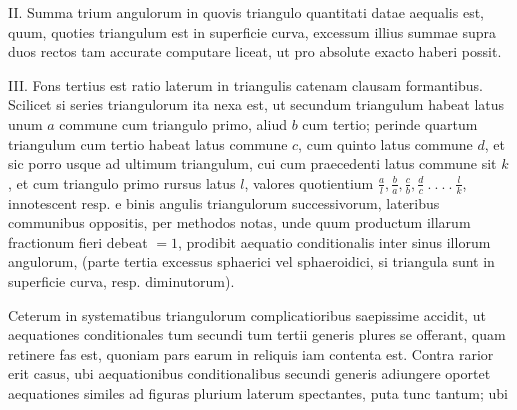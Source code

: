 II. Summa trium angulorum in quovis triangulo quantitati datae aequalis est, quum, quoties triangulum est in superficie curva, excessum illius summae supra duos rectos tam accurate computare liceat, ut pro absolute exacto haberi possit.

III. Fons tertius est ratio laterum in triangulis catenam clausam formantibus. Scilicet si series triangulorum ita nexa est, ut secundum triangulum habeat latus unum \(a\) commune cum triangulo primo, aliud \(b\) cum tertio; perinde quartum triangulum cum tertio habeat latus commune \(c\), cum quinto latus commune \(d\), et sic porro usque ad ultimum triangulum, cui cum praecedenti latus commune sit \(k\), et cum triangulo primo rursus latus \(l\), valores quotientium \(\frac al,\allowbreak\frac ba,\allowbreak\frac cb,\allowbreak\frac dc\ .\ .\ .\ .\ \frac lk\), innotescent resp. e binis angulis triangulorum successivorum, lateribus communibus oppositis, per methodos notas, unde quum productum illarum fractionum fieri debeat \(=1\), prodibit aequatio conditionalis inter sinus illorum angulorum, (parte tertia excessus sphaerici vel sphaeroidici, si triangula sunt in superficie curva, resp. diminutorum).

Ceterum in systematibus triangulorum complicatioribus saepissime accidit, ut aequationes conditionales tum secundi tum tertii generis plures se offerant, quam retinere fas est, quoniam pars earum in reliquis iam contenta est. Contra rarior erit casus, ubi aequationibus conditionalibus secundi generis adiungere oportet aequationes similes ad figuras plurium laterum spectantes, puta tunc tantum; ubi
